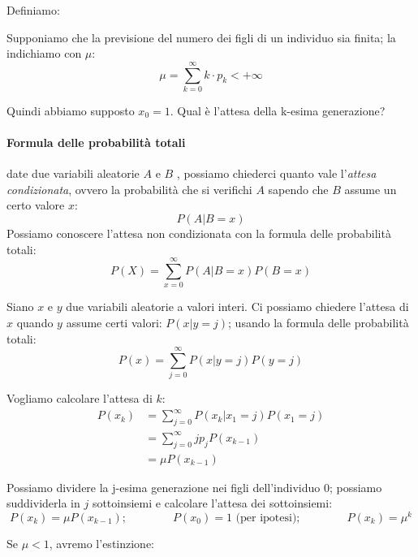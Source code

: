 \documentclass[a4paper,12pt]{book}
\begin{document}
Definiamo:

Supponiamo che la previsione del numero dei figli di un individuo sia finita; la indichiamo con $ \mu $:
$$ \mu = \sum_{k=0}^{\infty} k \cdot p_k < +\infty $$

Quindi abbiamo supposto $ x_0 = 1 $. Qual è l'attesa della k-esima generazione?

\begin{tcolorbox}
	\paragraph{Formula delle probabilità totali} date due variabili aleatorie $ A $ e $ B $ , possiamo chiederci quanto vale l'\textit{attesa condizionata}, ovvero la probabilità che si verifichi $ A $ sapendo che $ B $ assume un certo valore $ x $:
		$$ P(A | B = x) $$
	Possiamo conoscere l'attesa non condizionata con la formula delle probabilità totali:
		$$ P(X) = \sum_{x=0}^{\infty} P(A|B=x)P(B=x) $$
\end{tcolorbox}

Siano $ x $ e $ y $ due variabili aleatorie a valori interi. Ci possiamo chiedere l'attesa di $ x $ quando $ y $ assume certi valori: $ P(x | y = j) $; usando la formula delle probabilità totali: 
$$ P(x) = \sum_{j=0}^{\infty} P(x | y = j)P(y=j) $$

Vogliamo calcolare l'attesa di $ k $:
\begin{align*}
	P(x_k) & = \sum_{j=0}^{\infty} P(x_k | x_1 = j)P(x_1 = j) \\
	& = \sum_{j=0}^{\infty} jp_jP(x_{k-1}) \\
	& = \mu P(x_{k-1})
\end{align*}

Possiamo dividere la j-esima generazione nei figli dell'individuo 0; %
possiamo suddividerla in $ j $ sottoinsiemi e calcolare l'attesa dei sottoinsiemi:
$$ P(x_k) = \mu P(x_{k-1}); \qquad \qquad P(x_0) = 1 \text{ (per ipotesi)}; \qquad \qquad P(x_k)=\mu^k$$

Se $\mu < 1$, avremo l'estinzione:
\end{document}
